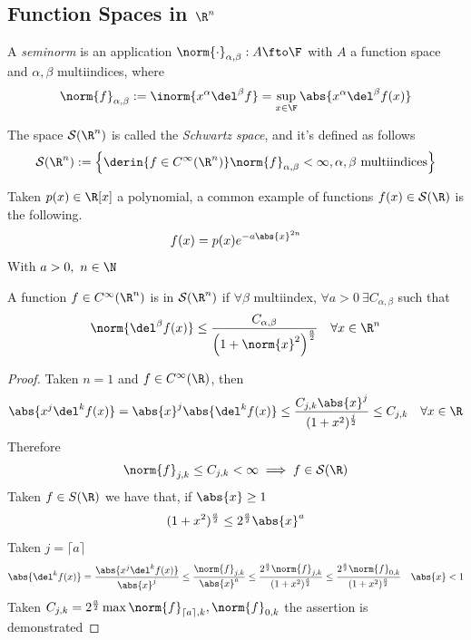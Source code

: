 \documentclass[../mmf.tex]{subfiles}
\begin{document}
\subsection{Function Spaces in $\R^n$}
\begin{dfn}[Seminorm]
	A \textit{seminorm} is an application $\norm{\cdot}_{\alpha,\beta}:A\fto\F$ with $A$ a function space and $\alpha,\beta$ multiindices, where
	\begin{equation}
		\norm{f}_{\alpha,\beta}:=\inorm{x^\alpha\del^\beta f}=\sup_{x\in\F}\abs{x^\alpha\del^\beta f(x)}
		\label{eq:seminorm}
	\end{equation}
\end{dfn}
\begin{dfn}
	The space $\mathcal{S}(\R^n)$ is called the \textit{Schwartz space}, and it's defined as follows
	\begin{equation}
		\mathcal{S}(\R^n):=\left\{ \derin{f\in C^\infty(\R^n)}\norm{f}_{\alpha,\beta}<\infty, \alpha,\beta\text{ multiindices} \right\}
		\label{eq:schwartzspace}
	\end{equation}
\end{dfn}
\begin{eg}
	Taken $p(x)\in\R[x]$ a polynomial, a common example of functions $f(x)\in\mathcal{S}(\R)$ is the following.
	\begin{equation}
		f(x)=p(x)e^{-a\abs{x}^{2n}}
		\label{eq:schwartzfunc}
	\end{equation}
	With $a>0,\ n\in\N$
\end{eg}
\begin{thm}
	A function $f\in C^\infty(\R^n)$ is in $\mathcal{S}(\R^n)$ if $\forall\beta$ multiindex, $\forall a>0\ \exists C_{\alpha,\beta}$ such that
	\begin{equation}
		\norm{\del^\beta f(x)}\le\frac{C_{\alpha,\beta}}{\left( 1+\norm{x}^2 \right)^{\frac{a}{2}}}\quad\forall x\in\R^n
		\label{eq:schwartzfunc2}
	\end{equation}
\end{thm}
\begin{proof}
	Taken $n=1$ and $f\in C^\infty(\R)$, then
	\begin{equation*}
		\abs{x^j\del^kf(x)}=\abs{x}^j\abs{\del^kf(x)}\le\frac{C_{j,k}\abs{x}^j}{(1+x^2)^{\frac{j}{2}}}\le C_{j,k}\quad\forall x\in\R
	\end{equation*}
	Therefore
	\begin{equation*}
		\norm{f}_{j,k}\le C_{j,k}<\infty\implies{} f\in\mathcal{S}(\R)
	\end{equation*}
	Taken $f\in{S}(\R)$ we have that, if $\abs{x}\ge1$
	\begin{equation*}
		(1+x^2)^{\frac{a}{2}}\le 2^{\frac{a}{2}}\abs{x}^a
	\end{equation*}
	Taken $j=\lceil a\rceil$
	\begin{equation*}
		\abs{\del^kf(x)}=\frac{\abs{x^j\del^kf(x)}}{\abs{x}^j}\le\frac{\norm{f}_{j,k}}{\abs{x}^a}\le\frac{2^{\frac{a}{2}}\norm{f}_{j,k}}{(1+x^2)^{\frac{a}{2}}}\le\frac{2^{\frac{a}{2}}\norm{f}_{0,k}}{(1+x^2)^{\frac{a}{2}}}\quad\abs{x}<1
	\end{equation*}
	Taken $C_{j,k}=2^{\frac{a}{2}}\max{\norm{f}_{\lceil a\rceil,k},\norm{f}_{0,k}}$ the assertion is demonstrated
\end{proof}
\end{document}

